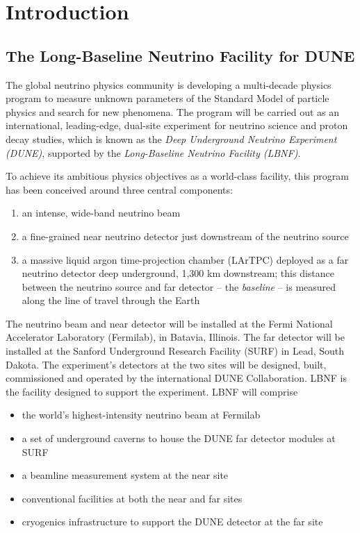 \chapter{Introduction}
\label{ch:fscf-intro}


\section{The Long-Baseline Neutrino Facility for DUNE}
\label{sec:pdr-intro-fscf}

The global neutrino physics community is developing a multi-decade physics program to measure unknown parameters of the Standard Model of particle physics and search for new phenomena. The program will be carried out as an international, leading-edge, dual-site experiment for neutrino science and proton decay studies, which is known as the \textit{Deep Underground Neutrino Experiment (DUNE)}, supported by the \textit{Long-Baseline Neutrino Facility (LBNF)}.

To achieve its ambitious physics objectives as a world-class facility, this program has been conceived around three central components: 
\begin{enumerate}
\item an intense, wide-band neutrino beam 
\item a fine-grained near neutrino detector just downstream of the neutrino source 
\item a massive liquid argon time-projection chamber (LArTPC) deployed as a far neutrino detector deep underground, 1,300 km downstream; this distance between the neutrino source and far detector -- the \textit{baseline} -- is measured along the line of travel through the Earth 
\end{enumerate}
The neutrino beam and near detector will be installed at the Fermi National Accelerator Laboratory (Fermilab), in Batavia, Illinois. The far detector will be installed at the Sanford Underground Research Facility (SURF) in Lead, South Dakota.
The experiment's detectors at the two sites will be designed, built, commissioned and operated by the international DUNE Collaboration.  LBNF is the facility designed to support the experiment. LBNF will comprise 
\begin{itemize}
\item the world's highest-intensity neutrino beam at Fermilab
\item a set of underground caverns to house the DUNE far detector modules at SURF 
\item a beamline measurement system at the near site
\item conventional facilities at both the near and far sites
\item cryogenics infrastructure to support the DUNE detector at the far site
\end{itemize}

